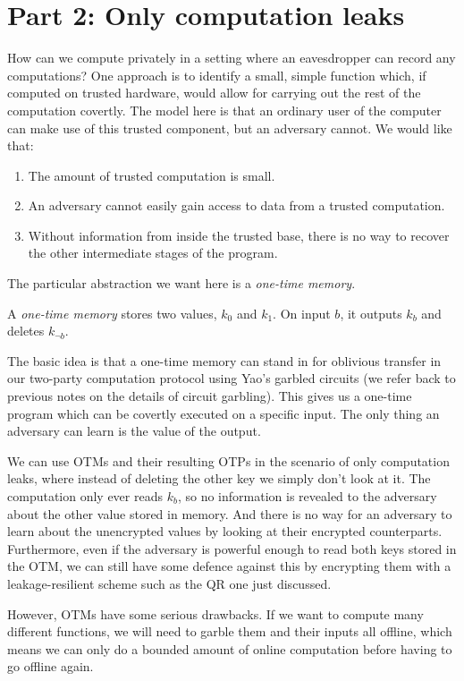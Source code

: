 \documentclass[10pt]{article}
\begin{document}
\section{Part 2: Only computation leaks}

How can we compute privately in a setting where an eavesdropper can record any computations? One approach is to identify a small, simple function which, if computed on trusted hardware, would allow for carrying out the rest of the computation covertly. The model here is that an ordinary user of the computer can make use of this trusted component, but an adversary cannot. We would like that:
\begin{enumerate}
\item The amount of trusted computation is small.
\item An adversary cannot easily gain access to data from a trusted computation.
\item Without information from inside the trusted base, there is no way to recover the other intermediate stages of the program.
\end{enumerate}

The particular abstraction we want here is a \emph{one-time memory}.

\begin{definition}
A \emph{one-time memory} stores two values, $k_0$ and $k_1$. On input $b$, it outputs $k_b$ and deletes $k_{\neg b}$.
\end{definition}

The basic idea is that a one-time memory can stand in for oblivious transfer in our two-party computation protocol using Yao's garbled circuits (we refer back to previous notes on the details of circuit garbling). This gives us a one-time program which can be covertly executed on a specific input. The only thing an adversary can learn is the value of the output.

We can use OTMs and their resulting OTPs in the scenario of only computation leaks, where instead of deleting the other key we simply don't look at it. The computation only ever reads $k_b$, so no information is revealed to the adversary about the other value stored in memory. And there is no way for an adversary to learn about the unencrypted values by looking at their encrypted counterparts. Furthermore, even if the adversary is powerful enough to read both keys stored in the OTM, we can still have some defence against this by encrypting them with a leakage-resilient scheme such as the QR one just discussed.

However, OTMs have some serious drawbacks. If we want to compute many different functions, we will need to garble them and their inputs all offline, which means we can only do a bounded amount of online computation before having to go offline again.


\nocite{*}


\end{document}
